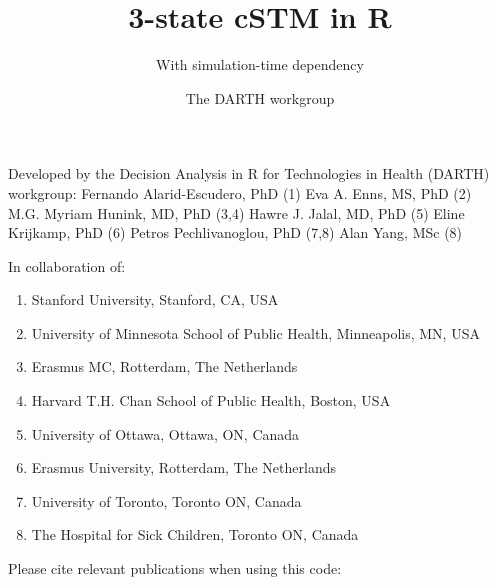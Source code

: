 \documentclass[
]{article}
\title{3-state cSTM in R}
\subtitle{With simulation-time dependency}
\author{The DARTH workgroup}
\date{}
\providecommand{\tightlist}{%
  \setlength{\itemsep}{0pt}\setlength{\parskip}{0pt}}
\begin{document}
\maketitle

Developed by the Decision Analysis in R for Technologies in Health
(DARTH) workgroup: Fernando Alarid-Escudero, PhD (1) Eva A. Enns, MS,
PhD (2)\\
M.G. Myriam Hunink, MD, PhD (3,4) Hawre J. Jalal, MD, PhD (5) Eline
Krijkamp, PhD (6) Petros Pechlivanoglou, PhD (7,8) Alan Yang, MSc (8)

In collaboration of:

\begin{enumerate}
\def\labelenumi{\arabic{enumi}.}
\tightlist
\item
  Stanford University, Stanford, CA, USA
\item
  University of Minnesota School of Public Health, Minneapolis, MN, USA
\item
  Erasmus MC, Rotterdam, The Netherlands
\item
  Harvard T.H. Chan School of Public Health, Boston, USA
\item
  University of Ottawa, Ottawa, ON, Canada
\item
  Erasmus University, Rotterdam, The Netherlands
\item
  University of Toronto, Toronto ON, Canada
\item
  The Hospital for Sick Children, Toronto ON, Canada
\end{enumerate}

Please cite relevant publications when using this code:
\end{document}
